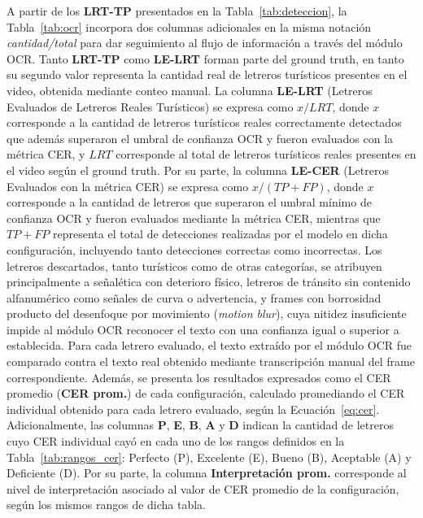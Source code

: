 \documentclass[runningheads]{llncs}
\begin{document}
A partir de los \textbf{LRT-TP} presentados en la 
Tabla~\ref{tab:deteccion}, la Tabla~\ref{tab:ocr} incorpora dos 
columnas adicionales en la misma notación \textit{cantidad/total} 
para dar seguimiento al flujo de información a través del módulo OCR. 
Tanto \textbf{LRT-TP} como \textbf{LE-LRT} forman parte del ground 
truth, en tanto su segundo valor representa la cantidad real de 
letreros turísticos presentes en el video, obtenida mediante conteo 
manual. La columna \textbf{LE-LRT} (Letreros Evaluados de 
Letreros Reales Turísticos) se expresa como $x/LRT$, donde $x$ 
corresponde a la cantidad de letreros turísticos reales correctamente 
detectados que además superaron el umbral de confianza OCR y fueron 
evaluados con la métrica CER, y $LRT$ corresponde al total de letreros 
turísticos reales presentes en el video según el ground truth. Por su 
parte, la columna \textbf{LE-CER} (Letreros Evaluados con la métrica 
CER) se expresa como $x/(TP+FP)$, donde $x$ corresponde a la cantidad 
de letreros que superaron el umbral mínimo de confianza OCR 
y fueron evaluados mediante la métrica CER, mientras que $TP+FP$ 
representa el total de detecciones realizadas por el modelo en dicha 
configuración, incluyendo tanto detecciones correctas como incorrectas. 
Los letreros descartados, tanto turísticos como de otras categorías, se 
atribuyen principalmente a señalética con deterioro físico, 
letreros de tránsito sin contenido alfanumérico como señales de curva 
o advertencia, y frames con borrosidad producto del desenfoque por 
movimiento (\textit{motion blur}), cuya nitidez insuficiente impide al 
módulo OCR reconocer el texto con una confianza igual o superior a 
establecida. Para cada letrero evaluado, el texto extraído por el módulo OCR 
fue comparado contra el texto real obtenido mediante transcripción 
manual del frame correspondiente. Además, se presenta los resultados expresados como el 
CER promedio (\textbf{CER prom.}) de cada configuración, calculado 
promediando el CER individual obtenido para cada letrero evaluado, 
según la Ecuación~\ref{eq:cer}. Adicionalmente, las columnas \textbf{P},
\textbf{E}, \textbf{B}, 
\textbf{A} y \textbf{D} indican la cantidad de letreros cuyo CER 
individual cayó en cada uno de los rangos definidos en la 
Tabla~\ref{tab:rangos_cer}: Perfecto (P), Excelente (E), Bueno (B), 
Aceptable (A) y Deficiente (D). Por su parte, la columna 
\textbf{Interpretación prom.} corresponde al nivel de interpretación 
asociado al valor de CER promedio de la configuración, según los 
mismos rangos de dicha tabla.
\end{document}
